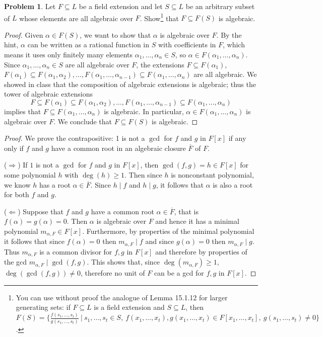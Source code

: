 \documentclass[11pt]{article}
\newcommand{\ov}[1]{\overline{#1}}
\def\ov#1{\overline{#1}}
\theoremstyle{definition}
\newtheorem{problem}{Problem}
\begin{document}
\begin{problem}
	Let $F \subseteq L$ be a field extension and let $S \subseteq L$ be an arbitrary subset of $L$ whose elements are all algebraic over $F$. Show\footnote{You can use without proof the analogue of Lemma 15.1.12 for larger generating sets: if $F\subseteq L$ is a field extension and $S\subseteq L$, then $F(S) = \{ \frac{f(s_1,\dots,s_t)}{g(s_1,\dots,s_t)} \ | \ s_1,\dots,s_t\in S, \ f(x_1,\dots,x_t), g(x_1,\dots,x_t)\in F[x_1,\dots,x_t], \ g(s_1,\dots,s_t)\neq 0\}$.}
	 that $F \subseteq F(S)$ is algebraic.
\end{problem}
\begin{proof}
Given $\alpha \in F(S)$, we want to show that $\alpha$ is algebraic over $F$. By the hint, $\alpha$ can be written as a rational function in $S$ with coefficients in $F$, which means it uses only finitely many elements $\alpha_1, \ldots, \alpha_n \in S$, so $\alpha \in F(\alpha_1, \ldots, \alpha_n)$. Since $\alpha_1, \ldots, \alpha_n \in S$ are all algebraic over $F$, the extensions $F \subseteq F(\alpha_1)$, $F(\alpha_1) \subseteq F(\alpha_1, \alpha_2), \ldots, F(\alpha_1, \ldots, \alpha_{n-1}) \subseteq F(\alpha_1, \ldots, \alpha_n)$ are all algebraic. We showed in class that the composition of algebraic extensions is algebraic; thus the tower of algebraic extensions
	$$F \subseteq F(\alpha_1) \subseteq F(\alpha_1, \alpha_2), \ldots, F(\alpha_1, \ldots, \alpha_{n-1}) \subseteq F(\alpha_1, \ldots, \alpha_n)$$
	implies that $F \subseteq F(\alpha_1, \ldots, \alpha_n)$ is algebraic. In particular, $\alpha \in F(\alpha_1, \ldots, \alpha_n)$ is algebraic over $F$. We conclude that $F \subseteq F(S)$ is algebraic.
	\end{proof}


\begin{proof}
We prove the contrapositive: 1 is  not a $\gcd$ for $f$ and $g$ in $F[x]$ if any only if $f$ and $g$ have a common root in an algebraic closure $\ov{F}$ of $F$.

($\Rightarrow$) If $1$ is not a $\gcd$ for $f$ and $g$ in $F[x]$, then $\gcd(f,g)=h\in F[x]$ for some polynomial $h$ with $\deg(h) \geqslant 1$. 
Then since $h$ is nonconstant polynomial, we know $h$ has a root $\alpha\in \ov{F}$. Since $h\mid f$ and $h\mid g$, it follows that $\alpha$ is also a root for both $f$ and $g$.

($\Leftarrow$) Suppose that $f$ and $g$ have a common root $\alpha \in \overline{F}$, that is $f(\alpha)=g(\alpha)=0$. Then $\alpha$ is algebraic over $F$ and hence it has a minimal polynomial $m_{\alpha,F}\in F[x]$. Furthermore, by properties of the minimal polynomial it follows that since $f(\alpha)=0$ then $m_{\alpha,F}\mid f$ and since $g(\alpha)=0$ then $m_{\alpha,F}\mid g$. Thus $m_{\alpha,F}$ is a common divisor for $f,g$ in $F[x]$ and therefore by properties of the gcd $m_{\alpha,F}\mid\gcd(f,g)$. This shows that, since $\deg(m_{\alpha,F})\geqslant 1$, $\deg(\gcd(f,g))\neq 0$, therefore no unit of $F$ can be a gcd for $f,g$ in $F[x]$.
\end{proof}
\end{document}

